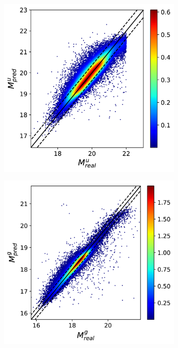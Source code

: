 \documentclass[12pt,letterpaper,oneside,openright]{book}
\begin{document}
\begin{figure}[]
  \begin{subfigure}[b]{0.3\textwidth}
    \includegraphics[width=\textwidth, height = \textwidth]{Figures/pmu3.png}
    \label{fig:1}
  \end{subfigure}
  \hspace{0cm}
  \begin{subfigure}[b]{0.3\textwidth}
    \includegraphics[width=\textwidth, height = \textwidth]{Figures/pmg3.png}

\end{subfigure}
\end{figure}
\end{document}
